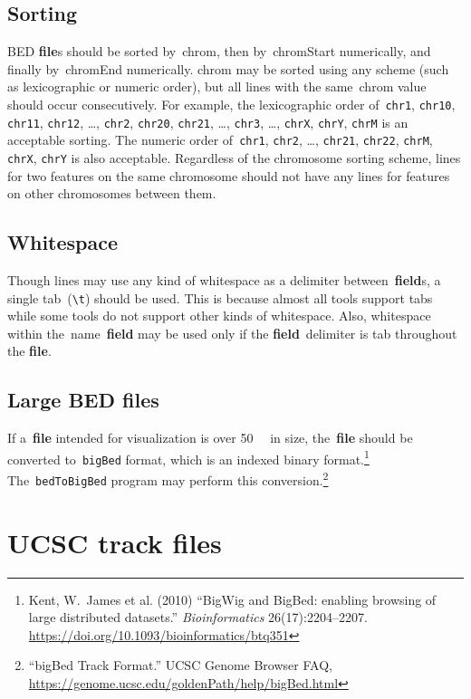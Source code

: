 \documentclass[11pt]{article}
\providecommand*{\Ac}[1]{\ac{#1}} %
\begin{document}
\subsection{Sorting}
\Ac{BED} \textbf{file}s should be sorted by~\textsf{chrom}, then by~\textsf{chromStart} numerically, and finally by~\textsf{chromEnd} numerically.
\textsf{chrom} may be sorted using any scheme (such as lexicographic or numeric order), but all lines with the same~\textsf{chrom} value should occur consecutively.
For example, the lexicographic order of~\texttt{chr1}, \texttt{chr10}, \texttt{chr11}, \texttt{chr12}, {\ldots}, \texttt{chr2}, \texttt{chr20}, \texttt{chr21}, {\ldots}, \texttt{chr3}, {\ldots}, \texttt{chrX}, \texttt{chrY}, \texttt{chrM} is an acceptable sorting.
The numeric order of~\texttt{chr1}, \texttt{chr2}, {\ldots}, \texttt{chr21}, \texttt{chr22}, \texttt{chrM}, \texttt{chrX}, \texttt{chrY} is also acceptable.
Regardless of the chromosome sorting scheme, lines for two features on the same chromosome should not have any lines for features on other chromosomes between them.

\subsection{Whitespace}\label{sec:whitespace}
Though lines may use any kind of whitespace as a delimiter between~\textbf{field}s, a single tab~(\texttt{{\textbackslash}t}) should be used.
This is because almost all tools support tabs while some tools do not support other kinds of whitespace.
Also, whitespace within the~\textsf{name}~\textbf{field} may be used only if the \textbf{field}~delimiter is tab throughout the \textbf{file}.

\subsection{Large \acs{BED} files}
If a~\textbf{file} intended for visualization is over \SI{50}{\mebi\byte} in size, the~\textbf{file} should be converted to~\texttt{bigBed} format, which is an indexed binary format.\footnote{Kent, W.~James et al.
  (2010) ``BigWig and BigBed: enabling browsing of large distributed datasets.''
  \emph{Bioinformatics} 26(17):2204--2207.
  \url{https://doi.org/10.1093/bioinformatics/btq351}}
The~\texttt{bedToBigBed} program may perform this conversion.\footnote{``bigBed Track Format.''
  \Ac{UCSC} Genome Browser FAQ, \url{https://genome.ucsc.edu/goldenPath/help/bigBed.html}}

\section{\acs{UCSC} track files}
\end{document}
